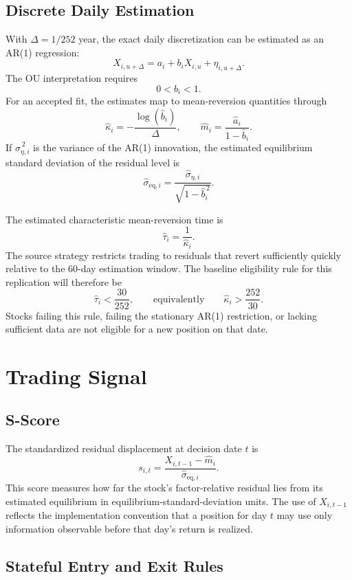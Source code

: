 \documentclass[11pt]{article}
\begin{document}
\subsection{Discrete Daily Estimation}

With $\Delta=1/252$ year, the exact daily discretization can be estimated as
an AR(1) regression:
\[
    X_{i,u+\Delta}
    =
    a_i + b_i X_{i,u} + \eta_{i,u+\Delta}.
\]
The OU interpretation requires
\[
    0 < b_i < 1.
\]
For an accepted fit, the estimates map to mean-reversion quantities through
\[
    \widehat{\kappa}_i
    =
    -\frac{\log(\widehat{b}_i)}{\Delta},
    \qquad
    \widehat{m}_i
    =
    \frac{\widehat{a}_i}{1-\widehat{b}_i}.
\]
If $\widehat{\sigma}_{\eta,i}^{\,2}$ is the variance of the AR(1)
innovation, the estimated equilibrium standard deviation of the residual
level is
\[
    \widehat{\sigma}_{\mathrm{eq},i}
    =
    \frac{\widehat{\sigma}_{\eta,i}}
         {\sqrt{1-\widehat{b}_i^{\,2}}}.
\]

The estimated characteristic mean-reversion time is
\[
    \widehat{\tau}_i = \frac{1}{\widehat{\kappa}_i}.
\]
The source strategy restricts trading to residuals that revert sufficiently
quickly relative to the 60-day estimation window. The baseline eligibility
rule for this replication will therefore be
\[
    \widehat{\tau}_i < \frac{30}{252},
    \qquad \text{equivalently} \qquad
    \widehat{\kappa}_i > \frac{252}{30}.
\]
Stocks failing this rule, failing the stationary AR(1) restriction, or lacking
sufficient data are not eligible for a new position on that date.

\section{Trading Signal}

\subsection{S-Score}

The standardized residual displacement at decision date $t$ is
\[
    s_{i,t}
    =
    \frac{X_{i,t-1}-\widehat{m}_i}
         {\widehat{\sigma}_{\mathrm{eq},i}}.
\]
This score measures how far the stock's factor-relative residual lies from its
estimated equilibrium in equilibrium-standard-deviation units. The use of
$X_{i,t-1}$ reflects the implementation convention that a position for day
$t$ may use only information observable before that day's return is realized.

\subsection{Stateful Entry and Exit Rules}
\end{document}
